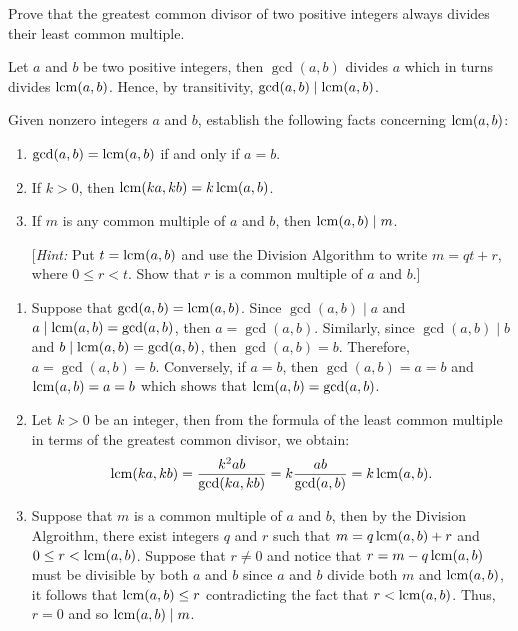 \begin{exercise}
    Prove that the greatest common divisor of two positive integers always divides their least common multiple. \\
\end{exercise}

\begin{solution}
    Let $a$ and $b$ be two positive integers, then $\gcd(a,b)$ divides $a$ which in turns divides $\operatorname{lcm}(a,b)$. Hence, by transitivity, $\gcd(a,b) \mid \operatorname{lcm}(a,b)$.\\
\end{solution}

\begin{exercise}
    Given nonzero integers $a$ and $b$, establish the following facts concerning $\operatorname{lcm}(a,b)$:
    \begin{enumerate}
        \item $\gcd(a,b) = \operatorname{lcm}(a,b)$ if and only if $a = b$.
        \item If $k > 0$, then $\operatorname{lcm}(ka, kb) = k\operatorname{lcm}(a,b)$.
        \item If $m$ is any common multiple of $a$ and $b$, then $\operatorname{lcm}(a,b) \mid m$.
        
        [\textit{Hint:} Put $t = \operatorname{lcm}(a,b)$ and use the Division Algorithm to write $m = qt + r$, where $0 \leq r < t$. Show that $r$ is a common multiple of $a$ and $b$.]
    \end{enumerate}
\end{exercise}

\begin{solution}
    \begin{enumerate}
        \item Suppose that $\gcd(a,b) = \operatorname{lcm}(a,b)$. Since $\gcd(a,b) \mid a$ and $a \mid \operatorname{lcm}(a,b) = \gcd(a,b)$, then $a = \gcd(a,b)$. Similarly, since $\gcd(a,b) \mid b$ and $b \mid \operatorname{lcm}(a,b) = \gcd(a,b)$, then $\gcd(a,b) = b$. Therefore, $a = \gcd(a,b) = b$. Conversely, if $a = b$, then $\gcd(a,b) = a = b$ and $\operatorname{lcm}(a,b) = a = b$ which shows that $\operatorname{lcm}(a,b) = \gcd(a,b)$.
        \item Let $k > 0$ be an integer, then from the formula of the least common multiple in terms of the greatest common divisor, we obtain:
        $$\operatorname{lcm}(ka, kb) = \frac{k^2ab}{\gcd(ka, kb)} = k\frac{ab}{\gcd(a,b)} = k \operatorname{lcm}(a,b).$$
        \item Suppose that $m$ is a common multiple of $a$ and $b$, then by the Division Algroithm, there exist integers $q$ and $r$ such that $m = q\operatorname{lcm}(a,b) + r$ and $0 \leq r < \operatorname{lcm}(a,b)$. Suppose that $r\neq 0$ and notice that $r = m - q\operatorname{lcm}(a,b)$ must be divisible by both $a$ and $b$ since $a$ and $b$ divide both $m$ and $\operatorname{lcm}(a,b)$, it follows that $\operatorname{lcm}(a,b) \leq r$ contradicting the fact that $r < \operatorname{lcm}(a,b)$. Thus, $r = 0$ and so $\operatorname{lcm}(a,b) \mid m$.
    \end{enumerate}
\end{solution}

